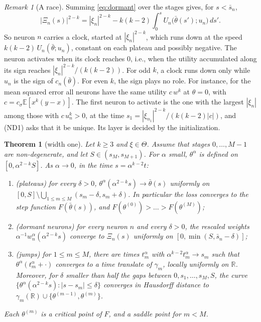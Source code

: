 \documentclass[11pt]{article}
\newtheorem{maintheorem}{Theorem}
\theoremstyle{definition}
\theoremstyle{remark}
\newtheorem{remark}{Remark}
\newcommand{\R}{\mathbb{R}}
\newcommand{\E}{\mathbb{E}}
\newcommand{\sm}{\setminus}
\newcommand{\ND}[1]{\textup{(ND#1)}}
\begin{document}
\begin{remark}[A race]\label{rem:race}
Summing \eqref{eq:dormant} over the stages gives, for $s<\bar s_n$,
\[
|\Xi_n(s)|^{2-k}=|\xi_n|^{2-k}-k(k-2)\int_0^sU_n\big(\bar\theta(s');u_n\big)\,ds' .
\]
So neuron $n$ carries a clock, started at $|\xi_n|^{2-k}$, which runs down at the speed $k(k-2)\,U_n(\bar\theta;u_n)$, constant on each plateau and possibly negative. The neuron activates when its clock reaches $0$, i.e., when the utility accumulated along its sign reaches $|\xi_n|^{2-k}/(k(k-2))$. For odd $k$, a clock runs down only while $u_n$ is the sign of $c_n(\bar\theta)$. For even $k$, the sign plays no role. For instance, for the mean squared error all neurons have the same utility $c\,w^k$ at $\theta=0$, with $c=c_\sigma\E[x^k(y-x)]$. The first neuron to activate is the one with the largest $|\xi_n|$ among those with $c\,u_n^k>0$, at the time $s_1=|\xi_{n_1}|^{2-k}/(k(k-2)|c|)$, and \ND1 asks that it be unique. Its layer is decided by the initialization.
\end{remark}

\begin{maintheorem}[width one]\label{thm:main}
Let $k\ge3$ and $\xi\in\Theta$. Assume that stages $0,\dots,M-1$ are non-degenerate, and let $S\in(s_M,s_{M+1})$. For $\alpha$ small, $\theta^\alpha$ is defined on $[0,\alpha^{2-k}S]$. As $\alpha\to0$, in the time $s=\alpha^{k-2}t$:
\begin{enumerate}[label=\textup{(\roman*)},nosep]
\item \emph{(plateaus)} for every $\delta>0$, $\theta^\alpha(\alpha^{2-k}s)\to\bar\theta(s)$ uniformly on $[0,S]\sm\bigcup_{1\le m\le M}(s_m-\delta,s_m+\delta)$. In particular the loss converges to the step function $F(\bar\theta(s))$, and $F(\theta^{(0)})>\dots>F(\theta^{(M)})$;
\item \emph{(dormant neurons)} for every neuron $n$ and every $\delta>0$, the rescaled weights $\alpha^{-1}w^\alpha_n(\alpha^{2-k}s)$ converge to $\Xi_n(s)$ uniformly on $[0,\min(S,\bar s_n-\delta)]$;
\item \emph{(jumps)} for $1\le m\le M$, there are times $t^\alpha_m$ with $\alpha^{k-2}t^\alpha_m\to s_m$ such that $\theta^\alpha(t^\alpha_m+\cdot)$ converges to a time translate of $\gamma_m$, locally uniformly on $\R$. Moreover, for $\delta$ smaller than half the gaps between $0,s_1,\dots,s_M,S$, the curve $\{\theta^\alpha(\alpha^{2-k}s):|s-s_m|\le\delta\}$ converges in Hausdorff distance to $\gamma_m(\R)\cup\{\theta^{(m-1)},\theta^{(m)}\}$.
\end{enumerate}
Each $\theta^{(m)}$ is a critical point of $F$, and a saddle point for $m<M$.
\end{maintheorem}
\end{document}

